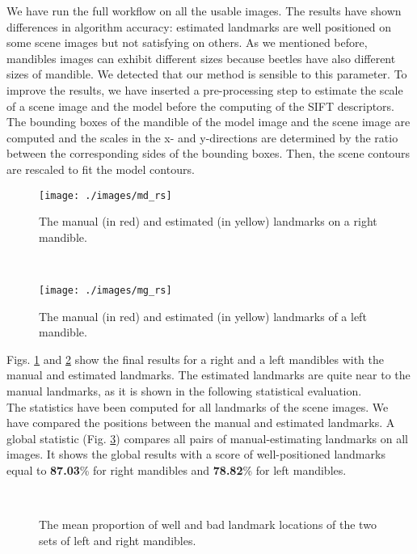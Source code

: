 \documentclass[twoside,twocolumn,10pt]{article}
\begin{document}
We have run the full workflow on all the usable images.
The results have shown differences in algorithm accuracy: estimated
landmarks are well positioned on some scene images but not satisfying
on others. As we mentioned before, mandibles images can exhibit
different sizes because beetles have also different sizes of
mandible. We detected that our method is sensible to this parameter.
To improve the results, we have inserted a pre-processing step to
estimate the scale of a scene image and the model before the
computing of the SIFT descriptors. The bounding boxes of the mandible
of the model image and the scene image are computed and the scales in the x-
and y-directions are determined by the ratio between the corresponding
sides of the bounding boxes. Then, the scene contours are rescaled to fit the model contours. \\
\begin{figure}[htbp]
\centering
\texttt{[image: ./images/md\_rs]}
\caption{The manual (in red) and estimated (in yellow) landmarks on a right mandible.}
\label{figresult}
\end{figure}~\\
\begin{figure}[htbp]
\centering
\texttt{[image: ./images/mg\_rs]}
\caption{The manual (in red) and estimated (in yellow) landmarks of a left mandible.}
\label{figresult2}
\end{figure}

Figs. \ref{figresult} and \ref{figresult2} show the final results
for a right and a left mandibles with the manual and estimated
landmarks. The estimated landmarks are quite near to the manual
landmarks, as it is shown in the following statistical evaluation.
\\
The statistics have been computed for all landmarks of the scene images.
We have compared the positions between the manual and estimated
landmarks. A global statistic (Fig. \ref{figctresult}) compares all pairs of
manual-estimating landmarks on all images. It shows the global results with a score of
well-positioned landmarks equal to \textbf{87.03}\% for right
mandibles and \textbf{78.82}\% for left mandibles.

\begin{figure}[htbp]
\centering
{}~~
\caption{The mean proportion of well and bad landmark locations of the two sets of left and right mandibles.}
\label{figctresult}
\end{figure}
\end{document}
